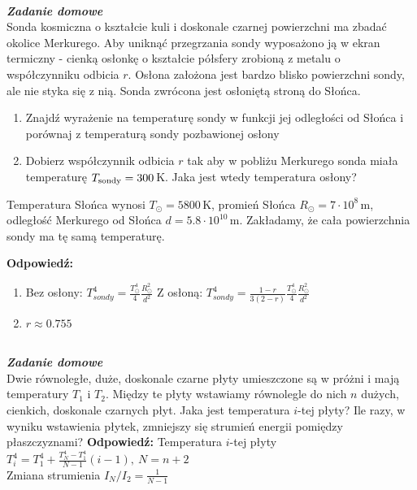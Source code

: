\documentclass[11pt,a4paper]{article}
\newcounter{zaddom}\newcommand{\zaddom}[1][]{\addtocounter{zaddom}{1} ~\\  {\bf \emph{Zadanie domowe \arabic{zaddom} #1 }} \\}
\begin{document}
\zaddom
Sonda kosmiczna o kształcie kuli i doskonale czarnej powierzchni ma zbadać okolice Merkurego. Aby uniknąć
przegrzania sondy wyposażono ją w ekran termiczny - cienką osłonkę o kształcie półsfery zrobioną z metalu
o współczynniku odbicia $r$. Osłona założona jest bardzo blisko powierzchni sondy, ale nie styka się z nią. Sonda
zwrócona jest osłoniętą stroną do Słońca.
\begin{enumerate}
\item Znajdź wyrażenie na temperaturę sondy w funkcji jej odległości od Słońca i porównaj z temperaturą sondy
pozbawionej osłony
\item Dobierz współczynnik odbicia $r$ tak aby w pobliżu Merkurego sonda miała temperaturę $T_{\rm sondy}= 300$\,K. 
Jaka jest wtedy temperatura osłony?
\end{enumerate}
Temperatura Słońca wynosi $T_\odot= 5800$\,K, promień Słońca $R_\odot = 7 \cdot 10^8$\,m, 
odległość Merkurego od Słońca $d = 5.8 \cdot 10^{10}$\,m. 
Zakładamy, że cała powierzchnia sondy ma tę samą temperaturę.

\vskip 10pt
\textbf{Odpowiedź:}
\begin{enumerate}
\item Bez osłony: $T_{sondy}^4 = \frac{T_\odot^4}{4} \frac{R_\odot^2}{d^2}$
Z osłoną: $T_{sondy}^4 = \frac{1-r}{3(2-r)} \frac{T_\odot^4}{4} \frac{R_\odot^2}{d^2}$
\item $r \approx 0.755$
\end{enumerate}

\zaddom
Dwie równoległe, duże, doskonale czarne płyty umieszczone są w próżni i mają temperatury $T_1$ i $T_2$.
Między te płyty wstawiamy równolegle do nich $n$ dużych, cienkich, doskonale czarnych płyt.
Jaka jest temperatura $i$-tej płyty? 
Ile razy, w wyniku wstawienia płytek, zmniejszy się strumień energii pomiędzy płaszczyznami? 
\vskip 10pt
\textbf{Odpowiedź:}
Temperatura $i$-tej płyty $T_i^{4} = T_1^4 + \frac{T_N^4-T_1^4}{N-1} (i-1), ~ N = n+2$\\
Zmiana strumienia $I_N/I_2 = \frac{1}{N-1} $
\end{document}
